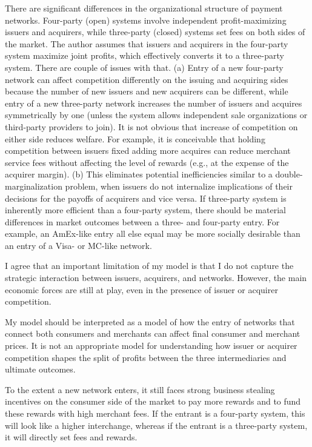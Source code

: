 \documentclass[main.tex]{subfiles}
\begin{document}
\begin{refsection}
\begin{refcommentnoclear}
There are significant differences in the organizational structure of payment networks.
Four-party (open) systems involve independent profit-maximizing issuers and acquirers, while three-party (closed) systems set fees on both sides of the market.
The author assumes that issuers and acquirers in the four-party system maximize joint profits, which effectively converts it to a three-party system.
There are couple of issues with that.
(a) Entry of a new four-party network can affect competition differently on the issuing and acquiring sides because the number of new issuers and new acquirers can be different, while entry of a new three-party network increases the number of issuers and acquires symmetrically by one (unless the system allows independent sale organizations or third-party providers to join).
It is not obvious that increase of competition on either side reduces welfare.
For example, it is conceivable that holding competition between issuers fixed adding more acquires can reduce merchant service fees without affecting the level of rewards (e.g., at the expense of the acquirer margin).
(b) This eliminates potential inefficiencies similar to a double-marginalization problem, when issuers do not internalize implications of their decisions for the payoffs of acquirers and vice versa.
If three-party system is inherently more efficient than a four-party system, there should be material differences in market outcomes between a three- and four-party entry.
For example, an AmEx-like entry all else equal may be more socially desirable than an entry of a Visa- or MC-like network.
\end{refcommentnoclear}

I agree that an important limitation of my model is that I do not capture the strategic interaction between issuers, acquirers, and networks.
However, the main economic forces are still at play, even in the presence of issuer or acquirer competition.

My model should be interpreted as a model of how the entry of networks that connect both consumers and merchants can affect final consumer and merchant prices.
It is not an appropriate model for understanding how issuer or acquirer competition shapes the split of profits between the three intermediaries and ultimate outcomes.

To the extent a new network enters, it still faces strong business stealing incentives on the consumer side of the market to pay more rewards and to fund these rewards with high merchant fees.
If the entrant is a four-party system, this will look like a higher interchange, whereas if the entrant is a three-party system, it will directly set fees and rewards.


\end{refsection}
\end{document}
